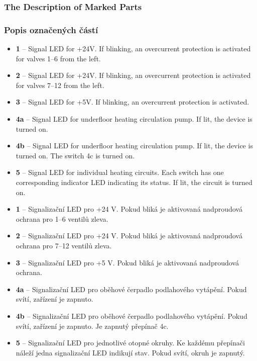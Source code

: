 \begin{English}
\subsubsection{The Description of Marked Parts}
\end{English}

\begin{Czech}
\subsubsection{Popis označených částí}
\end{Czech}


\begin{English}
\begin{itemize}
  \item \textbf{1} – Signal LED for +24V. If blinking, an overcurrent protection is activated for valves 1–6 from the left.
   \item \textbf{2} – Signal LED for +24V. If blinking, an overcurrent protection is activated for valves 7–12 from the left. 
   \item \textbf{3} – Signal LED for +5V. If blinking, an overcurrent protection is activated.
    \item \textbf{4a} – Signal LED for underfloor heating circulation pump. If lit, the device is turned on.
    \item \textbf{4b} – Signal LED for underfloor heating circulation pump. If lit, the device is turned on. The switch 4c is turned on.  
     \item \textbf{5} – Signal LED for individual heating circuits. Each switch has one corresponding indicator LED indicating its status. If lit, the circuit is turned on.
\end{itemize}
\end{English}

\begin{Czech}
\begin{itemize}
  \item \textbf{1} – Signalizační LED pro +24 V. Pokud bliká je aktivovaná nadproudová ochrana pro 1–6 ventilů zleva.
   \item \textbf{2} – Signalizační LED pro +24 V. Pokud bliká je aktivovaná nadproudová ochrana pro 7–12 ventilů zleva.  
   \item \textbf{3} – Signalizační LED pro +5 V. Pokud bliká je aktivovaná nadproudová ochrana.
    \item \textbf{4a} – Signalizační LED pro oběhové čerpadlo podlahového vytápění. Pokud svítí, zařízení je zapnuto.
    \item \textbf{4b} – Signalizační LED pro oběhové čerpadlo podlahového vytápění. Pokud svítí, zařízení je zapnuto. Je zapnutý přepínač 4c.  
     \item \textbf{5} – Signalizační LED pro jednotlivé otopné okruhy. Ke každému přepínači náleží jedna signalizační LED indikují stav. Pokud svítí, okruh je zapnutý.
\end{itemize}
\end{Czech}


